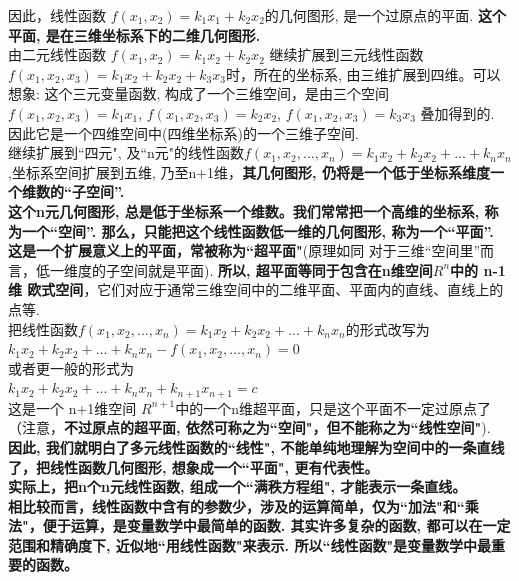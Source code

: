 \documentclass[UTF8]{ctexart}
\begin{document}
因此，线性函数 $f(x_1, x_2) = k_1 x_1 + k_2 x_2$的几何图形, 是一个过原点的平面. \textbf{这个平面, 是在三维坐标系下的二维几何图形.}\\

由二元线性函数 $
f\left( x_1,x_2 \right) =k_1x_2+k_2x_2
$ 继续扩展到三元线性函数$
f\left( x_1,x_2,x_3 \right) =k_1x_2+k_2x_2+k_3x_3
$时，所在的坐标系, 由三维扩展到四维。可以想象: 这个三元变量函数, 构成了一个三维空间，是由三个空间
$f\left( x_1,x_2,x_3 \right) =k_1x_1$, 
$f\left( x_1,x_2,x_3 \right) =k_2x_2$,
$f\left( x_1,x_2,x_3 \right) =k_3x_3$ 叠加得到的. 因此它是一个四维空间中(四维坐标系)的一个三维子空间. \\

继续扩展到``四元", 及``n元"的线性函数$
f\left( x_1,x_2,...,x_n \right) =k_1x_2+k_2x_2+...+k_nx_n
$,坐标系空间扩展到五维, 乃至n+1维，\textbf{其几何图形, 仍将是一个低于坐标系维度一个维数的``子空间''.} \\

\textbf{这个n元几何图形, 总是低于坐标系一个维数。我们常常把一个高维的坐标系, 称为一个``空间''. 那么，只能把这个线性函数低一维的几何图形, 称为一个``平面''. 这是一个扩展意义上的平面，常被称为``超平面"}(原理如同 对于三维``空间里''而言，低一维度的子空间就是平面). \textbf{所以, 超平面等同于包含在n维空间$R^n$中的 n-1维 欧式空间}，它们对应于通常三维空间中的二维平面、平面内的直线、直线上的点等. \\


把线性函数$
f\left( x_1,x_2,...,x_n \right) =k_1x_2+k_2x_2+...+k_nx_n
$的形式改写为 \\
$
k_1x_2+k_2x_2+...+k_nx_n-f\left( x_1,x_2,...,x_n \right) =0
$\\
或者更一般的形式为\\
$
k_1x_2+k_2x_2+...+k_nx_n+k_{n+1}x_{n+1}=c
$\\
这是一个 n+1维空间 $R^{n+1}$中的一个n维超平面，只是这个平面不一定过原点了（注意，\textbf{不过原点的超平面, 依然可称之为``空间"，但不能称之为``线性空间"}). \\

\textbf{因此, 我们就明白了多元线性函数的``线性", 不能单纯地理解为空间中的一条直线了，把线性函数几何图形, 想象成一个``平面", 更有代表性。}\\
\textbf{实际上，把n个n元线性函数, 组成一个``满秩方程组", 才能表示一条直线。}\\

\textbf{相比较而言，线性函数中含有的参数少，涉及的运算简单，仅为``加法"和``乘法"，便于运算，是变量数学中最简单的函数. 其实许多复杂的函数, 都可以在一定范围和精确度下, 近似地``用线性函数"来表示. 所以``线性函数"是变量数学中最重要的函数。}\\
\end{document}
